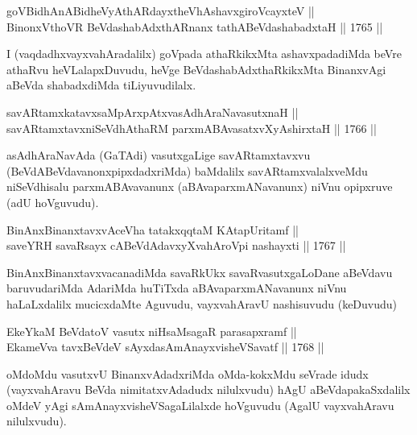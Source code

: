 \begin{shl}
goVBidhAnABidheVyAthARdayxtheVhAshavxgiroVcayxteV || \\
BinonxV\s thoVR BeVdashabAdxthARnanx tathA\s BeVdashabadxtaH ||  1765 ||  
\end{shl}

\begin{artha}
I (vaqdadhxvayxvahAradalilx) goVpada athaRkikxMta ashavxpadadiMda
beVre athaRvu heVLalapxDuvudu, heVge BeVdashabAdxthaRkikxMta
BinanxvAgi aBeVda shabadxdiMda tiLiyuvudilalx.
\end{artha}


\begin{shl}
savARtamxkatavxsaMpArxpAtxvasAdhAraNavasutxnaH || \\
savARtamxtavxniSeVdhAthaRM parxmABAvasatxvXyA\s \s shirxtaH ||  1766 ||  
\end{shl}

\begin{artha}
asAdhAraNavAda (GaTAdi) vasutxgaLige savARtamxtavxvu
(BeVdABeVdavanonxpipxdadxriMda) baMdalilx savARtamxvalalxveMdu
niSeVdhisalu parxmABAvavanunx (aBAvaparxmANavanunx) niVnu opipxruve
(adU hoVguvudu). 
\end{artha}

\begin{shl}
BinAnxBinanxtavxvAceVha tatakxqqtaM KAtapUritamf || \\
saveYRH savaRsayx cABeVdAdavxyXvahAroV\s pi nashayxti ||  1767 || 
\end{shl}

\begin{artha}
BinAnxBinanxtavxvacanadiMda savaRkUkx savaRvasutxgaLoDane aBeVdavu
baruvudariMda AdariMda huTiTxda aBAvaparxmANavanunx niVnu haLaLxdalilx
mucicxdaMte Aguvudu, vayxvahAravU nashisuvudu (keDuvudu)
\end{artha}


\begin{shl}
EkeYkaM BeVdatoV vasutx niHsaMsagaR parasapxramf || \\
EkameVva tavxBeVdeV sAyxdasAmAnayxvisheVSavatf ||  1768 ||  
\end{shl}

\begin{artha}
oMdoMdu vasutxvU BinanxvAdadxriMda oMda-kokxMdu seVrade idudx
(vayxvahAravu BeVda nimitatxvAdadudx nilulxvudu) hAgU aBeVdapakaSxdalilx oMdeV yAgi sAmAnayxvisheVSagaLilalxde hoVguvudu (AgalU
vayxvahAravu nilulxvudu).
\end{artha}

